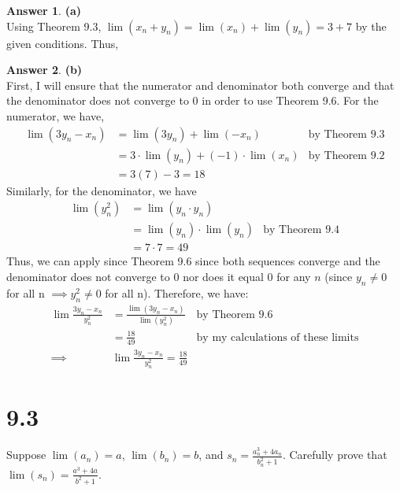 \documentclass[10pt,a4paper]{article}
\theoremstyle{definition}
\newtheorem*{answer*}{Answer}
\begin{document}
\begin{answer*}{\textbf{(a)}}
\\Using Theorem 9.3, $\lim(x_n + y_n) = \lim(x_n) + \lim(y_n) = 3 + 7$ by the given conditions. Thus, 
\end{answer*}

\begin{answer*}{\textbf{(b)}}
\\First, I will ensure that the numerator and denominator both converge and that the denominator does not converge to 0 in order to use Theorem 9.6. For the numerator, we have,
\begin{align*}
\lim(3y_n - x_n) &= \lim(3y_n) + \lim(-x_n) &\text{by Theorem 9.3}\\
&= 3\cdot \lim(y_n) + (-1) \cdot \lim(x_n) &\text{by Theorem 9.2}\\
&= 3 (7) - 3 = 18
\end{align*}
Similarly, for the denominator, we have
\begin{align*}
\lim(y_n^2) &= \lim(y_n \cdot y_n)\\
&= \lim(y_n) \cdot \lim(y_n) &\text{by Theorem 9.4}\\
&= 7 \cdot 7 = 49
\end{align*}
Thus, we can apply since Theorem 9.6 since both sequences converge and the denominator does not converge to 0 nor does it equal 0 for any $n$ (since $y_n \neq 0$ for all n $\implies y_n^2 \neq 0$ for all n). Therefore, we have:
\begin{align*}
\lim \frac{3y_n - x_n}{y_n^2} &= \frac{\lim(3y_n - x_n)}{\lim(y_n^2)} &\text{by Theorem 9.6}\\
&= \frac{18}{49} &\text{by my calculations of these limits}\\
\implies &\boxed{\lim \frac{3y_n - x_n}{y_n^2} = \frac{18}{49}}
\end{align*}
\end{answer*}

\section*{9.3}
Suppose $\lim(a_n) = a$, $\lim(b_n) = b$, and $\displaystyle s_n = \frac{a_n^3 + 4a_n}{b_n^2 + 1}$. Carefully prove that $\displaystyle \lim(s_n) = \frac{a^3 + 4a}{b^2 + 1}$.
\end{document}

